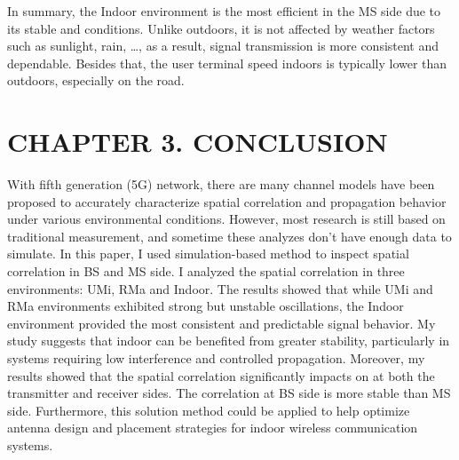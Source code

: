 \documentclass{article} %
\begin{document}
In summary, the Indoor environment is the most efficient in the MS side due to its stable and conditions. Unlike outdoors, it is not affected by weather factors such as sunlight, rain, \dots, as a result, signal transmission is more consistent and dependable. Besides that, the user terminal speed indoors is typically lower than outdoors, especially on the road.

\clearpage

\section*{CHAPTER 3. CONCLUSION}
With fifth generation (5G) network, there are many channel models have been proposed to accurately characterize spatial correlation and propagation behavior under various environmental conditions. However, most research is still based on traditional measurement, and sometime these analyzes don’t have enough data to simulate. In this paper, I used simulation-based method to inspect spatial correlation in BS and MS side. I analyzed the spatial correlation in three environments: UMi, RMa and Indoor. The results showed that while UMi and RMa environments exhibited strong but unstable oscillations, the Indoor environment provided the most consistent and predictable signal behavior. My study suggests that indoor can be benefited from greater stability, particularly in systems requiring low interference and controlled propagation. Moreover, my results showed that the spatial correlation significantly impacts on at both the transmitter and receiver sides. The correlation at BS side is more stable than MS side. Furthermore, this solution method could be applied to help optimize antenna design and placement strategies for indoor wireless communication systems.

\clearpage



\end{document}

